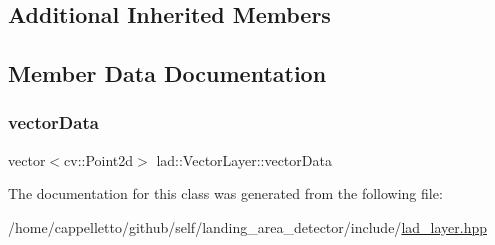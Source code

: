 \subsection*{Additional Inherited Members}


\subsection{Member Data Documentation}
\mbox{\label{classlad_1_1_vector_layer_ac027d923ab9f76e23d4d1253d7611348}} 
\subsubsection{\texorpdfstring{vector\+Data}{vectorData}}
{\footnotesize\ttfamily vector$<$cv\+::\+Point2d$>$ lad\+::\+Vector\+Layer\+::vector\+Data}



The documentation for this class was generated from the following file\+:\begin{DoxyCompactItemize}
\item 
/home/cappelletto/github/self/landing\+\_\+area\+\_\+detector/include/\hyperlink{lad__layer_8hpp}{lad\+\_\+layer.\+hpp}\end{DoxyCompactItemize}
